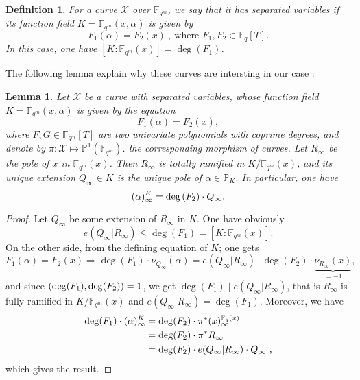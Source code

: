 \documentclass[10pt]{article}
\newtheorem{def1}[thm]{Definition}
\newtheorem{lem1}[thm]{Lemma}
\newcommand{\s}{\vspace{0.3cm}}
\newcommand{\cd}{\cdot}
\newcommand{\PP}{\mathbb{P}}
\newcommand{\fqm}{\mathbb{F}_{q^m}}
\newcommand{\fq}{\mathbb{F}_q}
\newcommand{\X}{\mathcal{X}}
\begin{document}
\s

\begin{def1} \label{courbes à variables séparées}
For a curve $\X$ over $\fqm$, we say that it has separated variables if its function field $K=\fqm(x,\alpha)$ is given by
\[F_1(\alpha) = F_2(x) \ , \ \textrm{where }  F_1,F_2 \in \fq[T].\]
In this case, one have $[K:\fqm(x)] = \deg({F_1})$.
\end{def1}

\s

The following lemma explain why these curves are intersting in our case :

\s

\begin{lem1} \label{lemdegré}
Let $\X$ be a curve with separated variables, whose function field $K=\fqm(x,\alpha)$ is given by the equation
\[F_1(\alpha) = F_2(x),\]
where $F,G \in \fqm[T]$ are two univariate polynomials with coprime degrees, and denote by $\pi : \X \longmapsto \PP^1(\fqm)$. the corresponding morphism of curves. Let $R_{\infty}$ be the pole of $x$ in $\fqm(x)$. Then $R_{\infty}$ is totally ramified in $K/\fqm(x)$, and its unique extension $Q_{\infty} \in K$ is the unique pole of $\alpha \in \PP_K$. In particular, one have 
\[(\alpha)^K_{\infty} = \deg{(F_{\rm 2}) \cd Q_{\infty}}.\]
\end{lem1}

\s

\begin{proof}
Let $Q_{\infty}$ be some extension of $R_{\infty}$ in $K$. One have obviously
\[e(Q_{\infty}|R_{\infty}) \leq \deg(F_1)=[K:\fqm(x)].\]
On the other side, from the defining equation of $K$; one gets
\[F_1(\alpha) = F_2(x) \Rightarrow \deg(F_1) \cd \nu_{Q_{\infty}}(\alpha) = e(Q_{\infty}|R_{\infty}) \cd \deg(F_2) \cd \underbrace{\nu_{R_{\infty}}(x)}_{=-1},\]
and since $(\deg(F_1),\deg( F_{\rm 2}))=1$, we get $\deg(F_1) \mid e(Q_{\infty}|R_{\infty})$, that is $R_{\infty}$ is fully ramified in $K/\fqm(x)$ and $e(Q_{\infty}|R_{\infty})=\deg(F_1)$. Moreover, we have 
\begin{align*}
\deg(F_1) \cd (\alpha)^K_{\infty} &= \deg(F_{\rm 2}) \cd \pi^*(x)^{\fq(x)}_{\infty} \\
&= \deg(F_{\rm 2}) \cd \pi^* R_{\infty} \\
&= \deg(F_{\rm 2}) \cd e(Q_{\infty}|R_{\infty}) \cd Q_{\infty} \ ,
\end{align*}
which gives the result.
\end{proof}

\s
\end{document}
